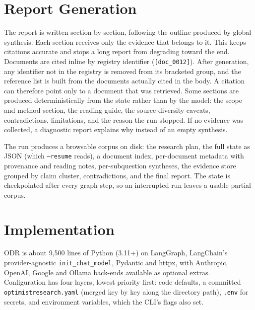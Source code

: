 \documentclass{article}
\newcommand{\code}[1]{\texttt{#1}}
\newcommand{\sys}{ODR}
\begin{document}
\section{Report Generation}
\label{sec:report}

The report is written section by section, following the outline produced by
global synthesis. Each section receives only the evidence that belongs to
it. This keeps citations accurate and stops a long report from degrading
toward the end. Documents are cited inline by registry identifier
(\code{[doc\_0012]}). After generation, any identifier not in the registry
is removed from its bracketed group, and the reference list is built from
the documents actually cited in the body. A citation can therefore point
only to a document that was retrieved. Some sections are produced
deterministically from the state rather than by the model: the scope and
method section, the reading guide, the source-diversity caveats,
contradictions, limitations, and the reason the run stopped. If no evidence
was collected, a diagnostic report explains why instead of an empty
synthesis.

The run produces a browsable corpus on disk: the research plan, the full
state as JSON (which \code{--resume} reads), a document index, per-document
metadata with provenance and reading notes, per-subquestion syntheses, the
evidence store grouped by claim cluster, contradictions, and the final
report. The state is checkpointed after every graph step, so an interrupted
run leaves a usable partial corpus.

\section{Implementation}
\label{sec:impl}

\sys{} is about 9{,}500 lines of Python (3.11+) on LangGraph, LangChain's
provider-agnostic \code{init\_chat\_model}, Pydantic and httpx, with
Anthropic, OpenAI, Google and Ollama back-ends available as optional
extras. Configuration has four layers, lowest priority first: code
defaults, a committed \code{optimistresearch.yaml} (merged key by key along the
directory path), \code{.env} for secrets, and environment variables, which
the CLI's flags also set.
\end{document}
